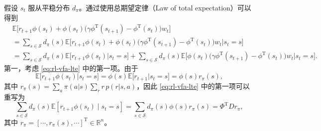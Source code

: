 \begin{note}[方框 8.3：证明引理 8.1]
假设 $s_t$ 服从平稳分布 $d_\pi$。通过使用总期望定律（Law of total expectation）可以得到
\begin{equation}
\begin{aligned}
& \mathbb{E}\Big[r_{t+1} \phi(s_{t}) + \phi(s_{t}) \big(\gamma \phi^{\mathrm{T}}(s_{t+1}) - \phi^{\mathrm{T}}(s_{t})\big) w_{t}\Big] \\
&= \sum_{s \in \mathcal{S}} d_{\pi}(s) \mathbb{E}\Big[r_{t+1} \phi(s_{t}) + \phi(s_{t}) \big(\gamma \phi^{\mathrm{T}}(s_{t+1}) - \phi^{\mathrm{T}}(s_{t})\big) w_{t} \big| s_{t} = s\Big] \\
&= \sum_{s \in \mathcal{S}} d_{\pi}(s) \mathbb{E}\Big[r_{t+1} \phi(s_{t}) \big| s_{t} = s\Big] + \sum_{s \in \mathcal{S}} d_{\pi}(s) \mathbb{E}\Big[\phi(s_{t}) \big(\gamma \phi^{\mathrm{T}}(s_{t+1}) - \phi^{\mathrm{T}}(s_{t})\big) w_{t} \big| s_{t} = s\Big].
\end{aligned}
\label{eq:rl-vfa-lte}
\end{equation}
第一，考虑 \cref{eq:rl-vfa-lte} 中的第一项。由于
\begin{equation*}
\mathbb{E}\Big[r_{t+1} \phi(s_{t}) \big| s_{t} = s\Big] = \phi(s) \mathbb{E}\Big[r_{t+1} \big| s_{t} = s\Big] = \phi(s) r_{\pi}(s),
\end{equation*}
其中 $r_{\pi}(s) = \sum_{a}\pi(a|s)\sum_{r}r\,p(r|s,a)$，因此 \cref{eq:rl-vfa-lte} 中的第一项可以重写为
\begin{equation}
\sum_{s \in \mathcal{S}} d_{\pi}(s) \mathbb{E}\left[r_{t+1} \phi\left(s_{t}\right) \mid s_{t} = s\right] = \sum_{s \in \mathcal{S}} d_{\pi}(s) \phi(s) r_{\pi}(s) = \Phi^{\mathrm{T}} D r_{\pi},
\label{eq:rl-vfa-term1}
\end{equation}
其中 $r_{\pi} = [\cdots, r_{\pi}(s), \cdots]^{\mathrm{T}} \in \mathbb{R}^{n}$。


\end{note}
